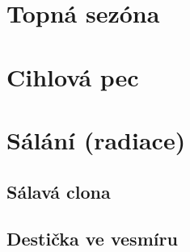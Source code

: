 \documentclass{article}
\begin{document}
\section{Topná sezóna \spicy \spicy \spicy}



\section{Cihlová pec \spicy \spicy \spicy \spicy}



\section{Sálání (radiace) \spicy \spicy}


\subsection{Sálavá clona}


\subsection{Destička ve vesmíru}
\end{document}
